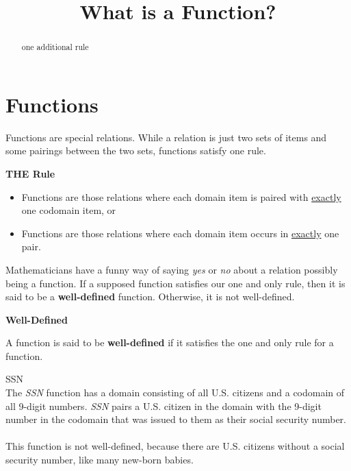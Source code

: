 \documentclass{ximera}
\title{What is a Function?}
\begin{document}
\begin{abstract}
one additional rule
\end{abstract}
\maketitle




\section{Functions}

Functions are special relations. While a relation is just two sets of items and some pairings between the two sets, functions satisfy one rule. 


\begin{condition} \textbf{\textcolor{purple!85!blue}{THE Rule}} 

\begin{itemize}
\item Functions are those relations where each domain item is paired with \underline{exactly} one codomain item, or
\item Functions are those relations where each domain item occurs in \underline{exactly} one pair.
\end{itemize}
\end{condition}





Mathematicians have a funny way of saying \textit{yes} or \textit{no} about a relation possibly being a function. If a supposed function satisfies our one and only rule, then it is said to be a \textbf{well-defined} function.  Otherwise, it is not well-defined.




\begin{definition} \textbf{\textcolor{green!50!black}{Well-Defined}}

A function is said to be \textbf{well-defined} if it satisfies the one and only rule for a function.
\end{definition}





\begin{example} SSN \\
The \textit{SSN} function has a domain consisting of all U.S. citizens and a codomain of all 9-digit numbers.  \textit{SSN} pairs a U.S. citizen in the domain with the 9-digit number in the codomain that was issued to them as their social security number. 
\\ \\ 
This function is not well-defined, because there are U.S. citizens without a social security number, like many new-born babies.
\end{example}
\end{document}

